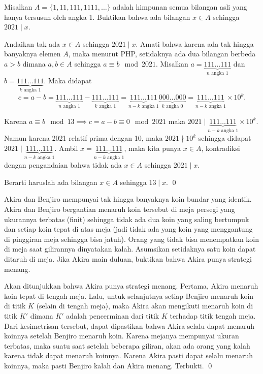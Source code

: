 \documentclass[11pt]{scrartcl}
\begin{document}
	\begin{soalbaru} 
		Misalkan $A = \{1,11,111,1111,\dots\}$ adalah himpunan semua bilangan asli yang hanya tersusun oleh angka 1. Buktikan bahwa ada bilangan $x \in A$ sehingga $2021 \mid x$.\\[-10pt]
		
		\begin{solusi}
		Andaikan tak ada $x \in A$ sehingga $2021 \mid x$. Amati bahwa karena ada tak hingga banyaknya elemen $A$, maka menurut PHP, setidaknya ada dua bilangan berbeda $a>b$ dimana $a,b \in A$ sehingga $a \equiv b \mod 2021$. Misalkan $a = \underbrace{111 \dots 111}_{n \text{ angka } 1}$ dan $b = \underbrace{111 \dots 111}_{k \text{ angka } 1}.$ Maka didapat\\[-20pt] $$c=a-b= \underbrace{111 \dots 111}_{n \text{ angka } 1} - \underbrace{111 \dots 111}_{k \text{ angka } 1}=\underbrace{111 \dots 111}_{n-k \text{ angka } 1}\underbrace{000 \dots 000}_{k \text{ angka } 0}=\underbrace{111 \dots 111}_{n-k \text{ angka } 1} \times 10^k.$$
		
		Karena $a \equiv b \mod 13 \implies c = a -b \equiv 0 \mod 2021$ maka $2021 \mid \underbrace{111 \dots 111}_{n-k \text{ angka } 1} \times 10^k$. Namun karena 2021 relatif prima dengan 10, maka $2021 \nmid 10^k$ sehingga didapat $2021 \mid \underbrace{111 \dots 111}_{n-k \text{ angka } 1}$. Ambil $x = \underbrace{111 \dots 111}_{n-k \text{ angka } 1}$, maka kita punya $x \in A$, kontradiksi dengan pengandaian bahwa tidak ada $x \in A$ sehingga $2021 \mid x$.
		
		Berarti haruslah ada bilangan $x \in A$ sehingga $13 \mid x$. \qed
		\end{solusi}
	\end{soalbaru}
	\newpage
	\begin{soalbaru}
		Akira dan Benjiro mempunyai tak hingga banyaknya koin bundar yang identik. Akira dan Benjiro bergantian menaruh koin tersebut di meja persegi yang ukurannya terbatas (finit) sehingga tidak ada dua koin yang saling bertumpuk dan setiap koin tepat di atas meja (jadi tidak ada yang koin yang menggantung di pinggiran meja sehingga bisa jatuh). Orang yang tidak bisa menempatkan koin di meja saat gilirannya dinyatakan kalah. Asumsikan setidaknya satu koin dapat ditaruh di meja. Jika Akira main duluan, buktikan bahwa Akira punya strategi menang.\\[-10pt]
		
		\begin{solusi}
		Akan ditunjukkan bahwa Akira punya strategi menang. Pertama, Akira menaruh koin tepat di tengah meja. Lalu, untuk selanjutnya setiap Benjiro menaruh koin di titik $K$ (selain di tengah meja), maka Akira akan mengikuti menaruh koin di titik $K'$ dimana $K'$ adalah pencerminan dari titik $K$ terhadap titik tengah meja. Dari kesimetrisan tersebut, dapat dipastikan bahwa Akira selalu dapat menaruh koinnya setelah Benjiro menaruh koin. Karena mejanya mempunyai ukuran terbatas, maka suatu saat setelah beberapa giliran, akan ada orang yang kalah karena tidak dapat menaruh koinnya. Karena Akira pasti dapat selalu menaruh koinnya, maka pasti Benjiro kalah dan Akira menang. Terbukti. \qed
		\end{solusi}
	\end{soalbaru}
	
\end{document}
